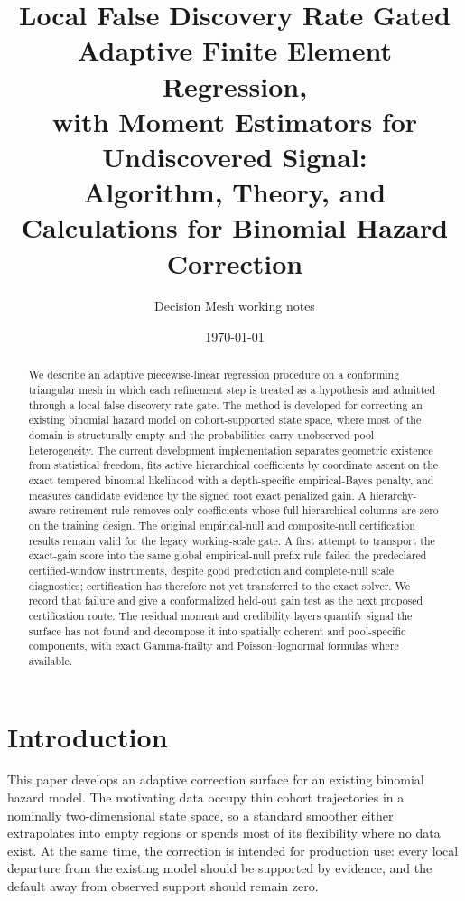 \documentclass[11pt]{article}
\title{Local False Discovery Rate Gated Adaptive Finite Element Regression,\\
with Moment Estimators for Undiscovered Signal:\\
\large Algorithm, Theory, and Calculations for Binomial Hazard Correction}
\author{Decision Mesh working notes}
\date{\today}
\begin{document}
\maketitle

\begin{abstract}
We describe an adaptive piecewise-linear regression procedure on a conforming triangular
mesh in which each refinement step is treated as a hypothesis and admitted through a
local false discovery rate gate. The method is developed for correcting an existing
binomial hazard model on cohort-supported state space, where most of the domain is
structurally empty and the probabilities carry unobserved pool heterogeneity. The current
development implementation separates geometric existence from statistical freedom, fits
active hierarchical coefficients by coordinate ascent on the exact tempered binomial
likelihood with a depth-specific empirical-Bayes penalty, and measures candidate evidence
by the signed root exact penalized gain. A hierarchy-aware retirement rule removes only
coefficients whose full hierarchical columns are zero on the training design. The
original empirical-null and composite-null certification results remain valid for the
legacy working-scale gate. A first attempt to transport the exact-gain score into the
same global empirical-null prefix rule failed the predeclared certified-window
instruments, despite good prediction and complete-null scale diagnostics; certification
has therefore not yet transferred to the exact solver. We record that failure and give a
conformalized held-out gain test as the next proposed certification route. The residual
moment and credibility layers quantify signal the surface has not found and decompose it
into spatially coherent and pool-specific components, with exact Gamma-frailty and
Poisson--lognormal formulas where available.
\end{abstract}

\tableofcontents

\section{Introduction}\label{sec:intro}

This paper develops an adaptive correction surface for an existing binomial hazard model. The
motivating data occupy thin cohort trajectories in a nominally two-dimensional state space, so a
standard smoother either extrapolates into empty regions or spends most of its flexibility where no
data exist. At the same time, the correction is intended for production use: every local departure
from the existing model should be supported by evidence, and the default away from observed support
should remain zero.
\end{document}
